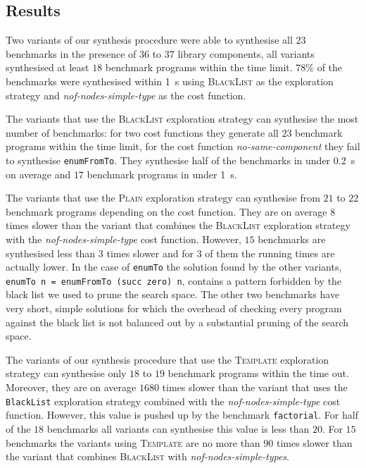 \subsection{Results}\label{Table summary}
Two variants of our synthesis procedure were able to synthesise all $23$ benchmarks in the presence of $36$ to $37$ library components, all variants synthesised at least $18$ benchmark programs within the time limit. $78\%$ of the benchmarks were synthesised within \SI{1}{s} using \textsc{BlackList} as the exploration strategy and \textit{nof-nodes-simple-type} as the cost function.

The variants that use the \textsc{BlackList} exploration strategy can synthesise the most number of benchmarks: for two cost functions they generate all $23$ benchmark programs within the time limit, for the cost function \textit{no-same-component} they fail to synthesise \lstinline?enumFromTo?. They synthesise half of the benchmarks in under \SI{0.2}{s} on average and $17$ benchmark programs in under \SI{1}{s}.

The variants that use the \textsc{Plain} exploration strategy can synthesise from $21$ to $22$ benchmark programs depending on the cost function. They are on average $8$ times slower than the variant that combines the \textsc{BlackList} exploration strategy with the \textit{nof-nodes-simple-type} cost function. However, $15$ benchmarks are synthesised less than $3$ times slower and for $3$ of them the running times are actually lower. In the case of \lstinline?enumTo? the solution found by the other variants, \lstinline?enumTo n = enumFromTo (succ zero) n?, contains a pattern forbidden by the black list we used to prune the search space. The other two benchmarks have very short, simple solutions for which the overhead of checking every program against the black list is not balanced out by a substantial pruning of the search space.

The variants of our synthesis procedure that use the \textsc{Template} exploration strategy can synthesise only $18$ to $19$ benchmark programs within the time out. Moreover, they are on average $1680$ times slower than the variant that uses the \lstinline?BlackList? exploration strategy combined with the \textit{nof-nodes-simple-type} cost function. However, this value is pushed up by the benchmark \lstinline?factorial?. For half of the $18$ benchmarks all variants can synthesise this value is less than $20$. For $15$ benchmarks the variants using \textsc{Template} are no more than $90$ times slower than the variant that combines \textsc{BlackList} with \textit{nof-nodes-simple-types}.


